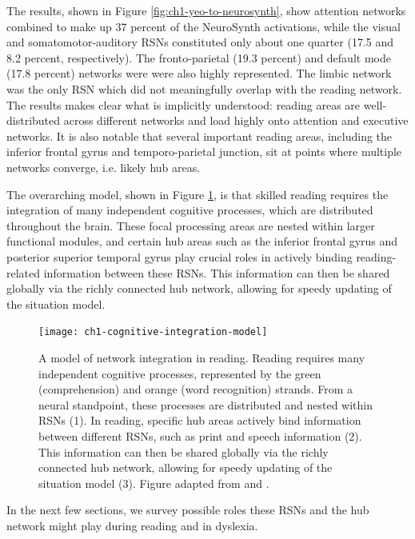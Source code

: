 The results, shown in Figure \ref{fig:ch1-yeo-to-neurosynth}, show attention networks combined to make up 37 percent of the NeuroSynth activations, while the visual and somatomotor-auditory RSNs constituted only about one quarter (17.5 and 8.2 percent, respectively). The fronto-parietal (19.3 percent) and default mode (17.8 percent) networks were were also highly represented. The limbic network was the only RSN which did not meaningfully overlap with the reading network. The results makes clear what is implicitly understood: reading areas are well-distributed across different networks and load highly onto attention and executive networks. It is also notable that several important reading areas, including the inferior frontal gyrus and temporo-parietal junction, sit at points where multiple networks converge, i.e. likely hub areas.

The overarching model, shown in Figure \ref{fig:ch1-cognitive-integration-model}, is that skilled reading requires the integration of many independent cognitive processes, which are distributed throughout the brain. These focal processing areas are nested within larger functional modules, and certain hub areas such as the inferior frontal gyrus and posterior superior temporal gyrus play crucial roles in actively binding reading-related information between these RSNs. This information can then be shared globally via the richly connected hub network, allowing for speedy updating of the situation model. 

\begin{figure}[t]
    \centering
    \texttt{[image: ch1-cognitive-integration-model]}
        \caption[Model of network integration in reading]{A model of network integration in reading. Reading requires many independent cognitive processes, represented by the green (comprehension) and orange (word recognition) strands. From a neural standpoint, these processes are distributed and nested within RSNs (1). In reading, specific hub areas actively bind information between different RSNs, such as print and speech information (2). This information can then be shared globally via the richly connected hub network, allowing for speedy updating of the situation model (3). Figure adapted from \cite{Scarborough2001} and \cite{Bailey2018}.}
    \label{fig:ch1-cognitive-integration-model}
\end{figure}

In the next few sections, we survey possible roles these RSNs and the hub network might play during reading and in dyslexia. 


